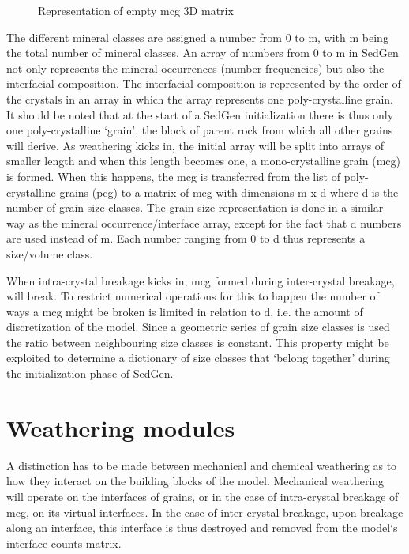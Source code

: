 \begin{figure}
    \centering
    
    \caption{Representation of empty mcg 3D matrix}
    \label{fig:mcg_matrix}
\end{figure}



The different mineral classes are assigned a number from 0 to m, with m being the total number of mineral classes. %
An array of numbers from 0 to m in SedGen not only represents the mineral occurrences (number frequencies) but also the interfacial composition. %
The interfacial composition is represented by the order of the crystals in an array in which the array represents one poly-crystalline grain. %
It should be noted that at the start of a SedGen initialization there is thus only one poly-crystalline `grain', the block of parent rock from which all other grains will derive. %
As weathering kicks in, the initial array will be split into arrays of smaller length and when this length becomes one, a mono-crystalline grain (mcg) is formed. %
When this happens, the mcg is transferred from the list of poly-crystalline grains (pcg) to a matrix of mcg with dimensions m x d where d is the number of grain size classes. %
The grain size representation is done in a similar way as the mineral occurrence/interface array, except for the fact that d numbers are used instead of m. %
Each number ranging from 0 to d thus represents a size/volume class. %


When intra-crystal breakage kicks in, mcg formed during inter-crystal breakage, will break. %
To restrict numerical operations for this to happen the number of ways a mcg might be broken is limited in relation to d, i.e. the amount of discretization of the model. %
Since a geometric series of grain size classes is used the ratio between neighbouring size classes is constant. %
This property might be exploited to determine a dictionary of size classes that `belong together' during the initialization phase of SedGen. %




\section{Weathering modules}
    A distinction has to be made between mechanical and chemical weathering as to how they interact on the building blocks of the model.
    Mechanical weathering will operate on the interfaces of grains, or in the case of intra-crystal breakage of mcg, on its virtual interfaces. %
    In the case of inter-crystal breakage, upon breakage along an interface, this interface is thus destroyed and removed from the model`s interface counts matrix. %

